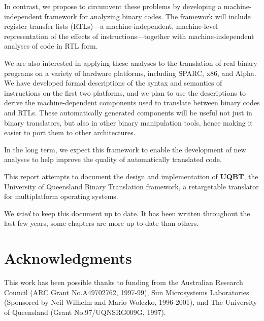 \documentclass[letter]{book}
\newcommand{\uqbt}{{\bf UQBT}}
\begin{document}
In contrast, we propose to circumvent these problems by developing a
machine-independent framework for analyzing binary codes.  The
framework will include register transfer lists (RTLs)---a
machine-independent, machine-level representation of the effects of
instructions---together with machine-independent analyses of code in
RTL form.  

We are also interested in applying these analyses to the translation of 
real binary programs on a variety of hardware platforms, including SPARC, 
x86, and Alpha.  We have developed formal descriptions of the syntax
and semantics of instructions on the first two platforms, and we plan
to use the descriptions to derive the machine-dependent components used 
to translate between binary codes and RTLs.  These automatically
generated components will be useful not just in binary translators,
but also in other binary manipulation tools, hence making it easier
to port them to other architectures.

In the long term, we expect this framework to enable the development
of new analyses to help improve the quality of automatically
translated code. 

This report attempts to document the design and implementation of  
\uqbt, the University of Queensland Binary Translation 
framework, a retargetable translator for multiplatform operating
systems. 

We {\em tried} to keep this document up to date.  It has been written 
throughout the last few years, some chapters are more up-to-date than 
others. 


\section*{Acknowledgments}
This work has been possible thanks to funding from the Australian
Research Council (ARC Grant No.A49702762, 1997-99), Sun Microsystems 
Laboratories (Sponsored by Neil Wilhelm and Mario Wolczko, 1996-2001), and 
The University of Queensland (Grant No.97/UQNSRG009G, 1997).  


\end{document}

